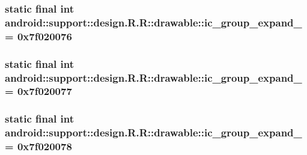 \hypertarget{classandroid_1_1support_1_1design_1_1_r_1_1drawable_6e1d211410f032337b52b936dadf176f}{
\subsubsection[{ic\_\-group\_\-expand\_\-07}]{\setlength{\rightskip}{0pt plus 5cm}static final int android::support::design.R.R::drawable::ic\_\-group\_\-expand\_ = 0x7f020076}}
\label{classandroid_1_1support_1_1design_1_1_r_1_1drawable_6e1d211410f032337b52b936dadf176f}


\hypertarget{classandroid_1_1support_1_1design_1_1_r_1_1drawable_92478726d5d68959c7e6d11b2ae5a3e4}{
\subsubsection[{ic\_\-group\_\-expand\_\-08}]{\setlength{\rightskip}{0pt plus 5cm}static final int android::support::design.R.R::drawable::ic\_\-group\_\-expand\_ = 0x7f020077}}
\label{classandroid_1_1support_1_1design_1_1_r_1_1drawable_92478726d5d68959c7e6d11b2ae5a3e4}


\hypertarget{classandroid_1_1support_1_1design_1_1_r_1_1drawable_3e8adceb7fc4c01416bddc024abeb725}{
\subsubsection[{ic\_\-group\_\-expand\_\-09}]{\setlength{\rightskip}{0pt plus 5cm}static final int android::support::design.R.R::drawable::ic\_\-group\_\-expand\_ = 0x7f020078}}
\label{classandroid_1_1support_1_1design_1_1_r_1_1drawable_3e8adceb7fc4c01416bddc024abeb725}


